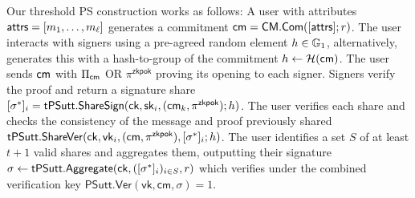 Our threshold PS construction works as follows:
A user with attributes $\mathsf{attrs} = [m_1, \ldots, m_\ell]$ generates a commitment $\mathsf{cm} = \mathsf{CM.Com}([\mathsf{attrs}];r)$. The user interacts with signers using a pre-agreed random element $h \in \mathbb{G}_1$, alternatively, \cite{sonnino_coconut_2020} generates this with a hash-to-group of the commitment $h \gets \mathcal{H}(\mathsf{cm})$. The user sends $\mathsf{cm}$ with $\Pi_{\mathsf{cm}}$ OR $\pi^{\mathsf{zkpok}}$ proving its opening to each signer. Signers verify the proof and return a signature share $[\sigma^*]_i = \mathsf{tPSutt.ShareSign}(\mathsf{ck}, \mathsf{sk}_i, (\mathsf{cm}_k, \pi^{\mathsf{zkpok}}); h)$. The user verifies each share and checks the consistency of the message and proof previously shared $\mathsf{tPSutt.ShareVer}(\mathsf{ck}, \mathsf{vk}_i, (\mathsf{cm}, \pi^{\mathsf{zkpok}}), [\sigma^*]_i; h)$. The user identifies a set $S$ of at least $t+1$ valid shares and aggregates them, outputting their signature $\sigma \leftarrow \mathsf{tPSutt.Aggregate}(\mathsf{ck}, ([\sigma^*]_i)_{i \in S}, r)$ which verifies under the combined  verification key $\mathsf{PSutt.Ver}(\mathsf{vk}, \mathsf{cm}, \sigma) = 1$.


